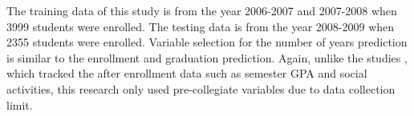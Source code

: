 \documentclass[12pt,english]{report}
\begin{document}
The training data of this study is from the year 2006-2007 and 2007-2008 when 3999 students were enrolled. The testing data is from the year 2008-2009 when 2355 students were enrolled. %
Variable selection for the number of years prediction is similar to the enrollment and graduation prediction. Again, unlike the studies \citep{Lin2009, deberard2004predictors, dekker2009}, which tracked the after enrollment data such as semester GPA and social activities, this research only used pre-collegiate variables due to data collection limit.

\end{document}
